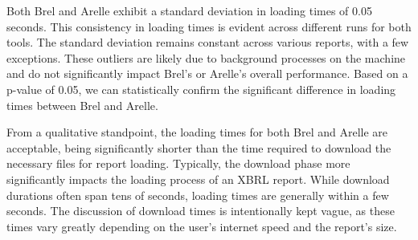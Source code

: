 Both Brel and Arelle exhibit a standard deviation in loading times of 0.05 seconds.
This consistency in loading times is evident across different runs for both tools.
The standard deviation remains constant across various reports, with a few exceptions.
These outliers are likely due to background processes on the machine and do not significantly impact Brel's or Arelle's overall performance.
Based on a p-value of 0.05, we can statistically confirm the significant difference in loading times between Brel and Arelle.




From a qualitative standpoint, the loading times for both Brel and Arelle are acceptable,
being significantly shorter than the time required to download the necessary files for report loading.
Typically, the download phase more significantly impacts the loading process of an XBRL report.
While download durations often span tens of seconds, loading times are generally within a few seconds.
The discussion of download times is intentionally kept vague, as these times vary greatly depending on the user's internet speed and the report's size.
